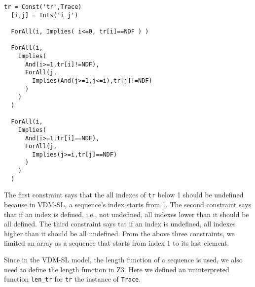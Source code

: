 \begin{mdframed}[roundcorner=5pt,shadow=true]
\begin{Verbatim}[fontsize=\small]
  tr = Const('tr',Trace)
  [i,j] = Ints('i j')

  ForAll(i, Implies( i<=0, tr[i]==NDF ) )

  ForAll(i,
    Implies(
      And(i>=1,tr[i]!=NDF),
      ForAll(j,
        Implies(And(j>=1,j<=i),tr[j]!=NDF)
      )
    )
  )

  ForAll(i,
    Implies(
      And(i>=1,tr[i]==NDF),
      ForAll(j,
        Implies(j>=i,tr[j]==NDF)
      )
    )
  )
\end{Verbatim}
\end{mdframed}

The first constraint says that the all indexes of {\tt tr} below 1 should be undefined because in VDM-SL, a sequence's index starts from 1. The second constraint says that if an index is defined, i.e., not undefined, all indexes lower than it should be all defined. The third constraint says tat if an index is undefined, all indexes higher than it should be all undefined. From the above three constraints, we limited an array as a sequence that starts from index 1 to its last element. 



Since in the VDM-SL model, the length function of a sequence is used, we also need to define the length function in Z3. Here we defined an uninterpreted function {\tt len\_tr} for {\tt tr} the instance of {\tt Trace}.

